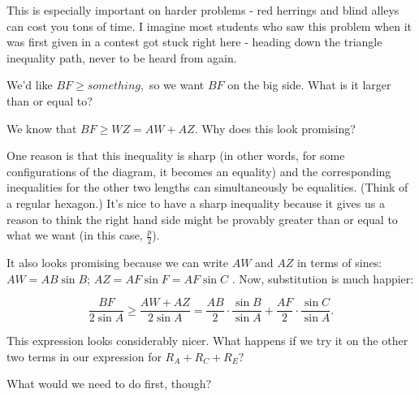 This is especially important on harder problems - red herrings and blind alleys can cost you tons of time.  I imagine most students who saw this problem when it was first given in a contest got stuck right here - heading down the triangle inequality path, never to be heard from again.

We'd like $BF \geq something,$ so we want $BF$ on the big side.  What is it larger than or equal to?



We know that $BF \geq WZ = AW + AZ.$  Why does this look promising?



One reason is that this inequality is sharp (in other words, for some configurations of the diagram, it becomes an equality) and the corresponding inequalities for the other two lengths can simultaneously be equalities.  (Think of a regular hexagon.)  It's nice to have a sharp inequality because it gives us a reason to think the right hand side might be provably greater than or equal to what we want (in this case, $\frac{p}{2}$).

It also looks promising because we can write $AW$ and $AZ$ in terms of sines: $AW = AB\sin B$; $AZ = AF\sin F = AF\sin C$ .  Now, substitution is much happier:

$$\frac{BF}{2 \sin A}\ge \frac{AW + AZ}{2 \sin A} = \frac{AB}{2}\cdot \frac{\sin B}{\sin A} + \frac{AF}{2}\cdot \frac{\sin C}{\sin A}.$$

This expression looks considerably nicer.  What happens if we try it on the other two terms in our expression for $R_A + R_C + R_E?$

What would we need to do first, though?

